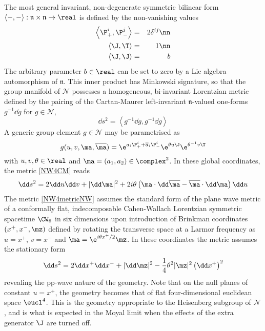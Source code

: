 The most general invariant, non-degenerate symmetric bilinear form
$\langle-,-\rangle:\mathfrak{n}\times\mathfrak{n}\to\real$
is defined by the non-vanishing values
\begin{eqnarray}
  \label{NW4innerprod}
  \left\langle\P^i_+ , \P^j_-\right\rangle&=&2 \delta^{ij}   \nn\\
  \left\langle\J , \T\right\rangle&=&1   \nn\\
  \left\langle\J , \J\right\rangle&=&b  
\end{eqnarray}
The arbitrary parameter $b\in\real$ can be set to zero by a Lie algebra
automorphism of $\mathfrak{n}$. This inner product has Minkowski signature, so
that the group manifold of $\mathcal N$ possesses a homogeneous, bi-invariant
Lorentzian metric defined by the pairing of the Cartan-Maurer left-invariant
$\mathfrak n$-valued one-forms $g^{-1} \dd g$ for $g\in\mathcal
N$,
\begin{equation}
  \label{NW4CM}
  \dd s^2=\left\langle g^{-1} \dd g , g^{-1} \dd g\right\rangle
\end{equation}
A generic group element $g\in\mathcal N$ may be parametrised as
\begin{equation}
  \label{NW4coords}
  g(u,v,\ma,\overline{\ma} )=\e^{a_i \P^i_++\overline{a}_i
    \P^i_-} \e^{\theta u \J} \e^{\theta^{-1} v \T}
\end{equation}
with $u,v,\theta\in\real$ and $\ma=(a_1,a_2)\in\complex^2$. In these global
coordinates, the metric \eqref{NW4CM} reads
\begin{equation}
  \label{NW4metricNW}
  \dd s^2=2 \dd u \dd v+|\dd\ma|^2+2 i \theta \left(\ma\cdot
    \dd\overline{\ma}-\overline{\ma}\cdot\dd\ma\right) \dd u  
\end{equation}
The metric \eqref{NW4metricNW} assumes the standard form of the plane wave
metric of a conformally flat, indecomposable Cahen-Wallach Lorentzian symmetric
spacetime $\CW_6$ in six dimensions upon introduction of Brinkman coordinates
$(x^+,x^-,\mz)$ defined by rotating the transverse space at a Larmor frequency
as $u=x^+$, $v=x^-$ and $\ma=\e^{ i \theta x^+/2} \mz$. In these coordinates the
metric assumes the stationary form
\begin{equation}
  \label{NW4metricBrink}
  \dd s^2=2 \dd x^+ \dd x^-+|\dd\mz|^2-\frac14  \theta^2 |\mz|^2 
  \left(\dd x^+\right)^2  
\end{equation}
revealing the pp-wave nature of the geometry. Note that on the null planes of
constant $u=x^+$, the geometry becomes that of flat four-dimensional euclidean
space $\eucl^4$. This is the geometry appropriate to the Heisenberg subgroup of
$\mathcal{N}$, and is what is expected in the Moyal limit when the effects of
the extra generator $\J$ are turned off.

